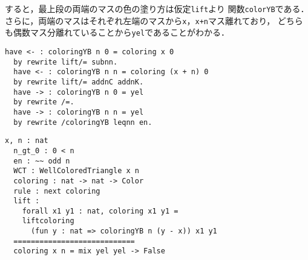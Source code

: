 すると，最上段の両端のマスの色の塗り方は仮定{\tt{lift}}より
関数{\tt{colorYB}}である．
さらに，両端のマスはそれぞれ左端のマスから{\tt{x}}，{\tt{x+n}}マス離れており，
どちらも偶数マス分離れていることから{\tt{yel}}であることがわかる．
\begin{lstlisting}[language=Coq]
  have <- : coloringYB n 0 = coloring x 0
  by rewrite lift/= subnn.
  have <- : coloringYB n n = coloring (x + n) 0
  by rewrite lift/= addnC addnK.
  have -> : coloringYB n 0 = yel
  by rewrite /=.
  have -> : coloringYB n n = yel
  by rewrite /coloringYB leqnn en.
\end{lstlisting}
\begin{lstlisting}[language=Coq]
  x, n : nat
  n_gt_0 : 0 < n
  en : ~~ odd n
  WCT : WellColoredTriangle x n
  coloring : nat -> nat -> Color
  rule : next coloring
  lift :
    forall x1 y1 : nat, coloring x1 y1 =
    liftcoloring
      (fun y : nat => coloringYB n (y - x)) x1 y1
  ============================
  coloring x n = mix yel yel -> False
\end{lstlisting}
